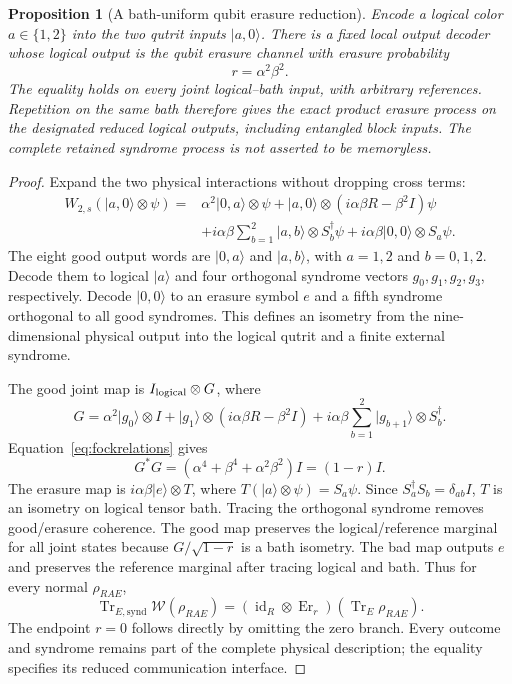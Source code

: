 \documentclass[11pt]{article}
\newtheorem{proposition}[theorem]{Proposition}
\newcommand{\Tr}{\operatorname{Tr}}
\newcommand{\id}{\operatorname{id}}
\newcommand{\ket}[1]{\lvert #1\rangle}
\begin{document}
\begin{proposition}[A bath-uniform qubit erasure reduction]\label{prop:erasure}
Encode a logical color $a\in\{1,2\}$ into the two qutrit inputs $\ket{a,0}$. There is a fixed local output decoder whose logical output is the qubit erasure channel with erasure probability
\[
 r=\alpha^2\beta^2.
\]
The equality holds on every joint logical--bath input, with arbitrary references. Repetition on the same bath therefore gives the exact product erasure process on the designated reduced logical outputs, including entangled block inputs. The complete retained syndrome process is not asserted to be memoryless.
\end{proposition}
\begin{proof}
Expand the two physical interactions without dropping cross terms:
\begin{align}
 W_{2,s}(\ket{a,0}\otimes\psi)={}&
 \alpha^2\ket{0,a}\otimes\psi
 +\ket{a,0}\otimes(i\alpha\beta R-\beta^2I)\psi\nonumber\\
 &+i\alpha\beta\sum_{b=1}^2\ket{a,b}\otimes S_b^\dagger\psi
 +i\alpha\beta\ket{0,0}\otimes S_a\psi.
 \label{eq:two-slot}
\end{align}
The eight good output words are $\ket{0,a}$ and $\ket{a,b}$, with $a=1,2$ and $b=0,1,2$. Decode them to logical $\ket a$ and four orthogonal syndrome vectors $g_0,g_1,g_2,g_3$, respectively. Decode $\ket{0,0}$ to an erasure symbol $e$ and a fifth syndrome orthogonal to all good syndromes. This defines an isometry from the nine-dimensional physical output into the logical qutrit and a finite external syndrome.

The good joint map is $I_{\rm logical}\otimes G$, where
\[
 G=\alpha^2\ket{g_0}\otimes I
 +\ket{g_1}\otimes(i\alpha\beta R-\beta^2I)
 +i\alpha\beta\sum_{b=1}^2\ket{g_{b+1}}\otimes S_b^\dagger.
\]
Equation~\eqref{eq:fockrelations} gives
\[
 G^*G=(\alpha^4+\beta^4+\alpha^2\beta^2)I=(1-r)I.
\]
The erasure map is $i\alpha\beta\ket e\otimes T$, where $T(\ket a\otimes\psi)=S_a\psi$. Since $S_a^\dagger S_b=\delta_{ab}I$, $T$ is an isometry on logical tensor bath. Tracing the orthogonal syndrome removes good/erasure coherence. The good map preserves the logical/reference marginal for all joint states because $G/\sqrt{1-r}$ is a bath isometry. The bad map outputs $e$ and preserves the reference marginal after tracing logical and bath. Thus for every normal $\rho_{RAE}$,
\[
 \Tr_{E,\mathrm{synd}}\mathcal W(\rho_{RAE})
 =(\id_R\otimes\operatorname{Er}_r)(\Tr_E\rho_{RAE}).
\]
The endpoint $r=0$ follows directly by omitting the zero branch. Every outcome and syndrome remains part of the complete physical description; the equality specifies its reduced communication interface.
\end{proof}
\end{document}
